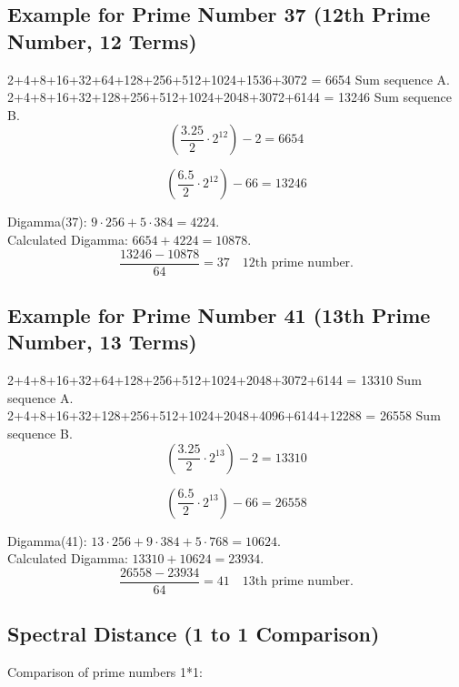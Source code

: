 \documentclass[a4paper,11pt]{article}
\begin{document}
\bigskip

\subsection*{Example for Prime Number 37 (12th Prime Number, 12 Terms)}

2+4+8+16+32+64+128+256+512+1024+1536+3072 = 6654 Sum sequence A.\\
2+4+8+16+32+128+256+512+1024+2048+3072+6144 = 13246 Sum sequence B.\\

\[
\left(\frac{3.25}{2} \cdot 2^{12}\right) - 2 = 6654
\]

\[
\left(\frac{6.5}{2} \cdot 2^{12}\right) - 66 = 13246
\]

Digamma(37): \(9 \cdot 256 + 5 \cdot 384 = 4224\).\\
Calculated Digamma: \(6654 + 4224 = 10878\).\\

\[
\frac{13246 - 10878}{64} = 37 \quad \text{12th prime number.}
\]

\bigskip

\subsection*{Example for Prime Number 41 (13th Prime Number, 13 Terms)}

2+4+8+16+32+64+128+256+512+1024+2048+3072+6144 = 13310 Sum sequence A.\\
2+4+8+16+32+128+256+512+1024+2048+4096+6144+12288 = 26558 Sum sequence B.\\

\[
\left(\frac{3.25}{2} \cdot 2^{13}\right) - 2 = 13310
\]

\[
\left(\frac{6.5}{2} \cdot 2^{13}\right) - 66 = 26558
\]

Digamma(41): \(13 \cdot 256 + 9 \cdot 384 + 5 \cdot 768 = 10624\).\\
Calculated Digamma: \(13310 + 10624 = 23934\).\\

\[
\frac{26558 - 23934}{64} = 41 \quad \text{13th prime number.}
\]

\bigskip

\subsection*{Spectral Distance (1 to 1 Comparison)}

Comparison of prime numbers 1*1:
\end{document}
